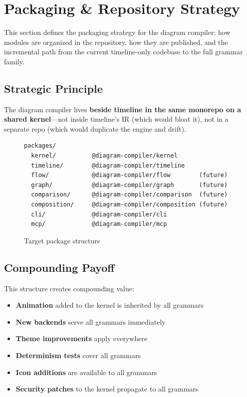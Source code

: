 \section{Packaging \& Repository Strategy}
\label{sec:packaging}

This section defines the packaging strategy for the diagram compiler: how modules are organized in the repository, how they are published, and the incremental path from the current timeline-only codebase to the full grammar family.

\subsection{Strategic Principle}

The diagram compiler lives \textbf{beside timeline in the same monorepo on a shared kernel}---not inside timeline's IR (which would bloat it), not in a separate repo (which would duplicate the engine and drift).

\begin{figure}[h]
\centering
\begin{Verbatim}[frame=single,fontsize=\small]
packages/
  kernel/          @diagram-compiler/kernel
  timeline/        @diagram-compiler/timeline
  flow/            @diagram-compiler/flow        (future)
  graph/           @diagram-compiler/graph       (future)
  comparison/      @diagram-compiler/comparison  (future)
  composition/     @diagram-compiler/composition (future)
  cli/             @diagram-compiler/cli
  mcp/             @diagram-compiler/mcp
\end{Verbatim}
\caption{Target package structure}
\label{fig:package-structure}
\end{figure}

\subsection{Compounding Payoff}

This structure creates compounding value:

\begin{itemize}
  \item \textbf{Animation} added to the kernel is inherited by all grammars
  \item \textbf{New backends} serve all grammars immediately
  \item \textbf{Theme improvements} apply everywhere
  \item \textbf{Determinism tests} cover all grammars
  \item \textbf{Icon additions} are available to all grammars
  \item \textbf{Security patches} to the kernel propagate to all grammars
\end{itemize}


